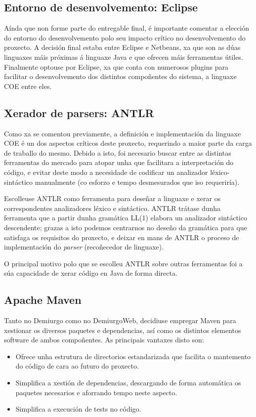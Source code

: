 \subsection{Entorno de desenvolvemento: Eclipse}
Aínda que non forme parte do entregable final, é importante comentar a elección
do entorno do desenvolvemento polo seu impacto crítico no desenvolvemento do
proxecto. A decisión final estaba entre Eclipse e Netbeans, xa que son as dúas
linguaxes máis próximas á linguaxe Java e que ofrecen máis ferramentas útiles.
Finalmente optouse por Eclipse, xa que conta con numerosos plugins para
facilitar o desenvolvemento dos distintos compoñentes do sistema, a linguaxe
COE entre eles.

\subsection{Xerador de parsers: ANTLR}
Como xa se comentou previamente, a definición e implementación da linguaxe COE é
un dos aspectos críticos deste proxecto, requerindo a maior parte da carga de
traballo do mesmo. Debido a isto, foi necesario buscar entre as distintas
ferramentas do mercado para atopar unha que facilitara a interpretación do
código, e evitar deste modo a necesidade de codificar un analizador
léxico-sintáctico manualmente (co esforzo e tempo desmesurados que iso
requeriría).
\par
Escolleuse ANTLR como ferramenta para deseñar a linguaxe e xerar os
correspondentes analizadores léxico e sintáctico. ANTLR trátase dunha ferramenta
que a partir dunha gramática LL(1) elabora un analizador sintáctico descendente;
grazas a isto podemos centrarnos no deseño da gramática para que satisfaga os
requisitos do proxecto, e deixar en mans de ANTLR o proceso de implementación
do \textit{parser} (recoñecedor de linguaxe).
\par
O principal motivo polo que se escolleu ANTLR sobre outras ferramentas foi a súa
capacidade de xerar código en Java de forma directa.

\subsection{Apache Maven}
Tanto no Demiurgo como no DemiurgoWeb, decidiuse empregar Maven para
xestionar os diversos paquetes e dependencias, así como os distintos elementos
software de ambos compoñentes.
As principais vantaxes disto son:
\begin{itemize}
  \item Ofrece unha estrutura de directorios estandarizada que facilita o
  mantemento do código de cara ao futuro do proxecto.
  \item Simplifica a xestión de dependencias, descargando de forma automática os
  paquetes necesarios e aforrando tempo neste aspecto.
  \item Simplifica a execución de tests no código.
\end{itemize}

